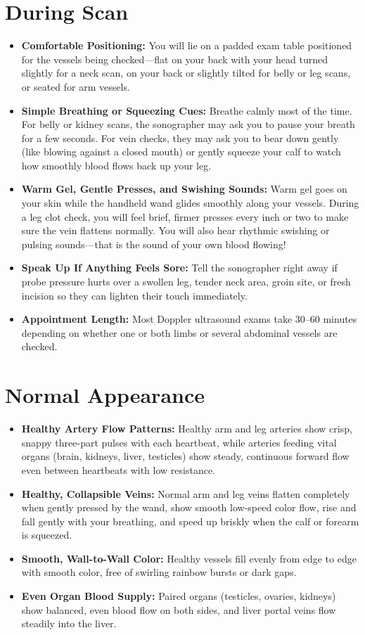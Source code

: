 \section{During Scan}
\begin{itemize}
\item \textbf{Comfortable Positioning:} You will lie on a padded exam table positioned for the vessels being checked---flat on your back with your head turned slightly for a neck scan, on your back or slightly tilted for belly or leg scans, or seated for arm vessels.
\item \textbf{Simple Breathing or Squeezing Cues:} Breathe calmly most of the time. For belly or kidney scans, the sonographer may ask you to pause your breath for a few seconds. For vein checks, they may ask you to bear down gently (like blowing against a closed mouth) or gently squeeze your calf to watch how smoothly blood flows back up your leg.
\item \textbf{Warm Gel, Gentle Presses, and Swishing Sounds:} Warm gel goes on your skin while the handheld wand glides smoothly along your vessels. During a leg clot check, you will feel brief, firmer presses every inch or two to make sure the vein flattens normally. You will also hear rhythmic swishing or pulsing sounds---that is the sound of your own blood flowing!
\item \textbf{Speak Up If Anything Feels Sore:} Tell the sonographer right away if probe pressure hurts over a swollen leg, tender neck area, groin site, or fresh incision so they can lighten their touch immediately.
\item \textbf{Appointment Length:} Most Doppler ultrasound exams take 30--60 minutes depending on whether one or both limbs or several abdominal vessels are checked.
\end{itemize}

\section{Normal Appearance}
\begin{itemize}
\item \textbf{Healthy Artery Flow Patterns:} Healthy arm and leg arteries show crisp, snappy three-part pulses with each heartbeat, while arteries feeding vital organs (brain, kidneys, liver, testicles) show steady, continuous forward flow even between heartbeats with low resistance.
\item \textbf{Healthy, Collapsible Veins:} Normal arm and leg veins flatten completely when gently pressed by the wand, show smooth low-speed color flow, rise and fall gently with your breathing, and speed up briskly when the calf or forearm is squeezed.
\item \textbf{Smooth, Wall-to-Wall Color:} Healthy vessels fill evenly from edge to edge with smooth color, free of swirling rainbow bursts or dark gaps.
\item \textbf{Even Organ Blood Supply:} Paired organs (testicles, ovaries, kidneys) show balanced, even blood flow on both sides, and liver portal veins flow steadily into the liver.
\end{itemize}

